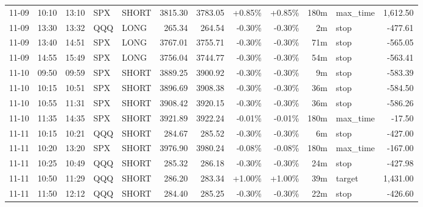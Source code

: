 \documentclass[11pt,a4paper,twoside]{article}
\begin{document}
\begin{center}
\begin{longtable}{>{\color{txtmain}}l l l l l r r r r r >{\color{txtmain}}l r}
11-09 & 10:10 & 13:10 & SPX & SHORT & 3815.30 & 3783.05 & \textcolor{wingreen}{+0.85\%} & \textcolor{wingreen}{+0.85\%} & 180m & max\_time & \textcolor{wingreen}{1,612.50} \\
11-09 & 13:30 & 13:32 & QQQ & LONG & 265.34 & 264.54 & \textcolor{lossred}{-0.30\%} & \textcolor{lossred}{-0.30\%} & 2m & stop & \textcolor{lossred}{-477.61} \\
11-09 & 13:40 & 14:51 & SPX & LONG & 3767.01 & 3755.71 & \textcolor{lossred}{-0.30\%} & \textcolor{lossred}{-0.30\%} & 71m & stop & \textcolor{lossred}{-565.05} \\
11-09 & 14:55 & 15:49 & SPX & LONG & 3756.04 & 3744.77 & \textcolor{lossred}{-0.30\%} & \textcolor{lossred}{-0.30\%} & 54m & stop & \textcolor{lossred}{-563.41} \\
11-10 & 09:50 & 09:59 & SPX & SHORT & 3889.25 & 3900.92 & \textcolor{lossred}{-0.30\%} & \textcolor{lossred}{-0.30\%} & 9m & stop & \textcolor{lossred}{-583.39} \\
11-10 & 10:15 & 10:51 & SPX & SHORT & 3896.69 & 3908.38 & \textcolor{lossred}{-0.30\%} & \textcolor{lossred}{-0.30\%} & 36m & stop & \textcolor{lossred}{-584.50} \\
11-10 & 10:55 & 11:31 & SPX & SHORT & 3908.42 & 3920.15 & \textcolor{lossred}{-0.30\%} & \textcolor{lossred}{-0.30\%} & 36m & stop & \textcolor{lossred}{-586.26} \\
11-10 & 11:35 & 14:35 & SPX & SHORT & 3921.89 & 3922.24 & \textcolor{lossred}{-0.01\%} & \textcolor{lossred}{-0.01\%} & 180m & max\_time & \textcolor{lossred}{-17.50} \\
11-11 & 10:15 & 10:21 & QQQ & SHORT & 284.67 & 285.52 & \textcolor{lossred}{-0.30\%} & \textcolor{lossred}{-0.30\%} & 6m & stop & \textcolor{lossred}{-427.00} \\
11-11 & 10:20 & 13:20 & SPX & SHORT & 3976.90 & 3980.24 & \textcolor{lossred}{-0.08\%} & \textcolor{lossred}{-0.08\%} & 180m & max\_time & \textcolor{lossred}{-167.00} \\
11-11 & 10:25 & 10:49 & QQQ & SHORT & 285.32 & 286.18 & \textcolor{lossred}{-0.30\%} & \textcolor{lossred}{-0.30\%} & 24m & stop & \textcolor{lossred}{-427.98} \\
11-11 & 10:50 & 11:29 & QQQ & SHORT & 286.20 & 283.34 & \textcolor{wingreen}{+1.00\%} & \textcolor{wingreen}{+1.00\%} & 39m & target & \textcolor{wingreen}{1,431.00} \\
11-11 & 11:50 & 12:12 & QQQ & SHORT & 284.40 & 285.25 & \textcolor{lossred}{-0.30\%} & \textcolor{lossred}{-0.30\%} & 22m & stop & \textcolor{lossred}{-426.60} \\

\end{longtable}
\end{center}
\end{document}
